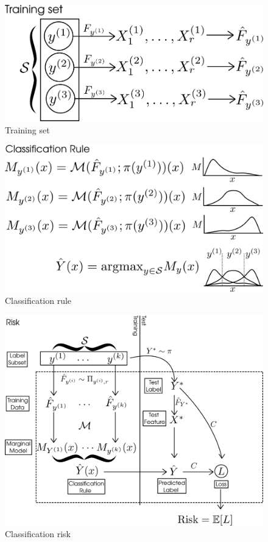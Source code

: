 \documentclass[12pt]{article}
\begin{document}
\begin{figure}[h]
\centering
\includegraphics[scale = 0.4]{extrapolation_figures/training_set.png}
\caption{Training set}\label{fig:training_set}
\end{figure}

\begin{figure}[h]
\centering
\includegraphics[scale = 0.4]{extrapolation_figures/classification_rule.png}
\caption{Classification rule}\label{fig:classification_rule}
\end{figure}

\begin{figure}[h]
\centering
\includegraphics[scale = 0.4]{extrapolation_figures/risk.png}
\caption{Classification risk}\label{fig:risk}
\end{figure}
\end{document}
